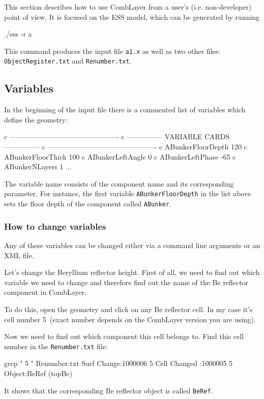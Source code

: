 This section describes how to use CombLayer from a user's (i.e. non-developer) point of view.
It is focused on the ESS model, which can be generated by running

\begin{bash}
  ./ess -r a
\end{bash}

This command produces the \mcnp input file {\tt a1.x} as well as two other files: {\tt ObjectRegister.txt} and {\tt Renumber.txt}.

\subsection{Variables}
In the beginning of the input file there is a commented list of variables which define the geometry:

\begin{deck}
 c ----------------------------------------------
 c --------------- VARIABLE CARDS ---------------
 c ----------------------------------------------
 c ABunkerFloorDepth 120
 c ABunkerFloorThick 100
 c ABunkerLeftAngle 0
 c ABunkerLeftPhase -65
 c ABunkerNLayers 1
 ...
\end{deck}

The variable name consists of the component name and its corresponding parameter. For instance,
the first variable {\tt ABunkerFloorDepth} in the list above sets the floor depth of the component called {\tt ABunker}.

\subsubsection{How to change variables}
Any of these variables can be changed either via a command line arguments or an XML file.

Let's change the Beryllium reflector height.
First of all, we need to find out which variable we need to change and therefore find out the name of the Be reflector
component in CombLayer.

To do this, open the \mcnp geometry and click on any Be reflector cell. In my case it's cell number 5~(exact number depends on the
CombLayer version you are using).

Now we need to find out which component this cell belongs to.  Find this cell number in the {\tt Renumber.txt} file:
\begin{bash}
grep " 5 " Renumber.txt 
Surf Change:1000006 5                                                           
Cell Changed :1000005 5 Object:BeRef (topBe)       
\end{bash}
It shows that the corresponding Be reflector object is called {\tt BeRef}.


